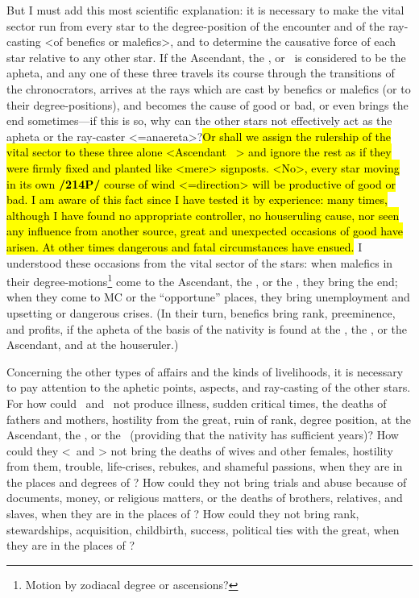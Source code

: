 But I must add this most scientific explanation: it is necessary to make the  vital sector run from every star to the degree-position of the encounter and of the ray-casting <of benefics or malefics>, and to determine the causative force of each star relative to any other star. If the Ascendant, the \Sun, or \Moon\, is considered to be the apheta, and any one of these three travels its course through the transitions of the chronocrators, arrives at the rays which are cast by benefics or malefics (or to their degree-positions), and becomes the cause of good or bad, or even brings the end sometimes—if this is so, why can the other stars not effectively act as the apheta or the ray-caster <=anaereta>?\hl{Or shall we assign the rulership of the vital sector to these three alone <Ascendant \Sun\, \Moon> and ignore the rest as if they were firmly fixed and planted like <mere> signposts. <No>, every star moving in its own \textbf{/214P/} course of wind <=direction> will be productive of good or bad. I am aware of this fact since I have tested it by experience: many times, although I have found no appropriate controller, no houseruling cause, nor seen any influence from another source, great and unexpected occasions of good have arisen. At other times dangerous and fatal circumstances have ensued.} I understood these occasions from the vital sector of the stars: when malefics in their degree-motions\footnote{Motion by zodiacal degree or ascensions?} come to the Ascendant, the \Sun, or the \Moon, they bring the end; when they come to MC or the “opportune” places, they bring unemployment and upsetting or dangerous crises. (In their turn, benefics bring rank, preeminence, and profits, if the apheta of the basis of the nativity is found at the \Sun, the \Moon, or the Ascendant, and at the houseruler.)

Concerning the other types of affairs and the kinds of livelihoods, it is necessary to pay attention to the aphetic points, aspects, and ray-casting of the other stars. For how could \Saturn\, and \Mars\, not produce illness, sudden critical times, the deaths of fathers and mothers, hostility from the great, ruin of rank, degree position, at the Ascendant, the \Sun, or the \Moon\, (providing that the nativity has sufficient years)? How could they <\Saturn\, and \Mars> not bring the deaths of wives and other females, hostility from them, trouble, life-crises, rebukes, and shameful passions, when they are in the places and degrees of \Venus? How could they not bring trials and abuse because of documents, money, or religious matters, or the deaths of brothers, relatives, and slaves, when they are in the places of \Mercury? How could they not bring rank, stewardships, acquisition, childbirth, success, political ties with the great, when they are in the places of
\Jupiter?


